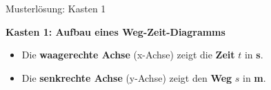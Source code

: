 \documentclass[aspectratio=169,11pt]{beamer}
\begin{document}
\begin{frame}{Musterlösung: Kasten 1}
    \begin{center}
        \begin{mlbox}
            \textbf{Kasten 1: Aufbau eines Weg-Zeit-Diagramms}

            \vspace{0.5em}
            \begin{itemize}
                \item Die \textbf{waagerechte Achse} (x-Achse) zeigt die \textcolor{loesung}{\textbf{Zeit}} $t$ in \textcolor{loesung}{\textbf{s}}.
                \item Die \textbf{senkrechte Achse} (y-Achse) zeigt den \textcolor{loesung}{\textbf{Weg}} $s$ in \textcolor{loesung}{\textbf{m}}.
            \end{itemize}
        \end{mlbox}
    \end{center}
\end{frame}

\end{document}
